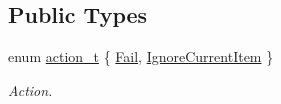 \subsection*{Public Types}
\begin{DoxyCompactItemize}
\item 
enum \hyperlink{classmdt_tt_test_model_abstract_generator_helper_abc4f8e08285031633b19282d517cc0b5}{action\-\_\-t} \{ \hyperlink{classmdt_tt_test_model_abstract_generator_helper_abc4f8e08285031633b19282d517cc0b5a3875da7533823e91cb3182984d232741}{Fail}, 
\hyperlink{classmdt_tt_test_model_abstract_generator_helper_abc4f8e08285031633b19282d517cc0b5a893d45fc1836c0760a75a92c8a0242f7}{Ignore\-Current\-Item}
 \}
\begin{DoxyCompactList}\small\item\em Action. \end{DoxyCompactList}\end{DoxyCompactItemize}
